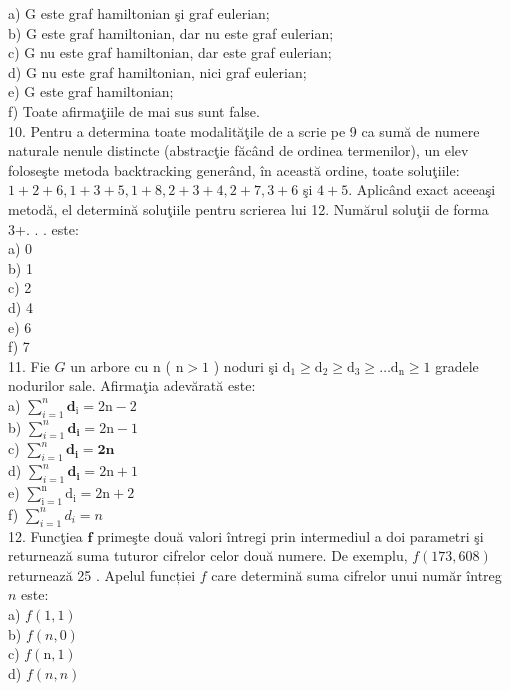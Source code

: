 a) G este graf hamiltonian şi graf eulerian;\\
b) G este graf hamiltonian, dar nu este graf eulerian;\\
c) G nu este graf hamiltonian, dar este graf eulerian;\\
d) G nu este graf hamiltonian, nici graf eulerian;\\
e) G este graf hamiltonian;\\
f) Toate afirmaţiile de mai sus sunt false.\\
10. Pentru a determina toate modalităţile de a scrie pe 9 ca sumă de numere naturale nenule distincte (abstracţie făcând de ordinea termenilor), un elev foloseşte metoda backtracking generând, în această ordine, toate soluţiile: $1+2+6,1+3+5,1+8,2+3+4,2+7,3+6$ şi $4+5$. Aplicând exact aceeaşi metodă, el determină soluţiile pentru scrierea lui 12. Numărul soluţii de forma 3+. . . este:\\
a) 0\\
b) 1\\
c) 2\\
d) 4\\
e) 6\\
f) 7\\
11. Fie $G$ un arbore cu n ( $\mathrm{n}>1$ ) noduri şi $\mathrm{d}_{1} \geq \mathrm{d}_{2} \geq \mathrm{d}_{3} \geq \ldots \mathrm{d}_{\mathrm{n}} \geq 1$ gradele nodurilor sale. Afirmaţia adevărată este:\\
a) $\sum_{i=1}^{n} \mathbf{d}_{\mathrm{i}}=2 \mathrm{n}-2$\\
b) $\sum_{i=1}^{n} \mathbf{d}_{\mathbf{i}}=2 \mathrm{n}-1$\\
c) $\sum_{i=1}^{n} \mathbf{d}_{\mathbf{i}}=\mathbf{2 n}$\\
d) $\sum_{i=1}^{n} \mathbf{d}_{\mathbf{i}}=2 \mathrm{n}+1$\\
e) $\sum_{\mathrm{i}=1}^{\mathrm{n}} \mathrm{d}_{\mathrm{i}}=2 \mathrm{n}+2$\\
f) $\sum_{i=1}^{n} d_{i}=n$\\
12. Funcţiea $\mathbf{f}$ primeşte două valori întregi prin intermediul a doi parametri şi returnează suma tuturor cifrelor celor două numere. De exemplu, $f(173,608)$ returnează 25 . Apelul funcției $f$ care determină suma cifrelor unui număr întreg $n$ este:\\
a) $f(1,1)$\\
b) $f(n, 0)$\\
c) $f(\mathrm{n}, 1)$\\
d) $f(n, n)$\\
